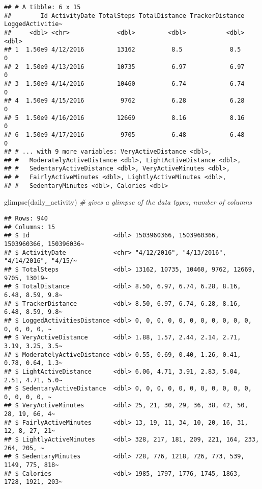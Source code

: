 \documentclass[
]{article}
\newenvironment{Shaded}{\begin{snugshade}}{\end{snugshade}}
\newcommand{\CommentTok}[1]{\textcolor[rgb]{0.56,0.35,0.01}{\textit{#1}}}
\newcommand{\FunctionTok}[1]{\textcolor[rgb]{0.00,0.00,0.00}{#1}}
\newcommand{\NormalTok}[1]{#1}
\begin{document}
\begin{verbatim}
## # A tibble: 6 x 15
##        Id ActivityDate TotalSteps TotalDistance TrackerDistance LoggedActivitie~
##     <dbl> <chr>             <dbl>         <dbl>           <dbl>            <dbl>
## 1  1.50e9 4/12/2016         13162          8.5             8.5                 0
## 2  1.50e9 4/13/2016         10735          6.97            6.97                0
## 3  1.50e9 4/14/2016         10460          6.74            6.74                0
## 4  1.50e9 4/15/2016          9762          6.28            6.28                0
## 5  1.50e9 4/16/2016         12669          8.16            8.16                0
## 6  1.50e9 4/17/2016          9705          6.48            6.48                0
## # ... with 9 more variables: VeryActiveDistance <dbl>,
## #   ModeratelyActiveDistance <dbl>, LightActiveDistance <dbl>,
## #   SedentaryActiveDistance <dbl>, VeryActiveMinutes <dbl>,
## #   FairlyActiveMinutes <dbl>, LightlyActiveMinutes <dbl>,
## #   SedentaryMinutes <dbl>, Calories <dbl>
\end{verbatim}

\begin{Shaded}
\begin{Highlighting}[]
\FunctionTok{glimpse}\NormalTok{(daily\_activity) }\CommentTok{\# gives a glimpse of the data types, number of columns  }
\end{Highlighting}
\end{Shaded}

\begin{verbatim}
## Rows: 940
## Columns: 15
## $ Id                       <dbl> 1503960366, 1503960366, 1503960366, 150396036~
## $ ActivityDate             <chr> "4/12/2016", "4/13/2016", "4/14/2016", "4/15/~
## $ TotalSteps               <dbl> 13162, 10735, 10460, 9762, 12669, 9705, 13019~
## $ TotalDistance            <dbl> 8.50, 6.97, 6.74, 6.28, 8.16, 6.48, 8.59, 9.8~
## $ TrackerDistance          <dbl> 8.50, 6.97, 6.74, 6.28, 8.16, 6.48, 8.59, 9.8~
## $ LoggedActivitiesDistance <dbl> 0, 0, 0, 0, 0, 0, 0, 0, 0, 0, 0, 0, 0, 0, 0, ~
## $ VeryActiveDistance       <dbl> 1.88, 1.57, 2.44, 2.14, 2.71, 3.19, 3.25, 3.5~
## $ ModeratelyActiveDistance <dbl> 0.55, 0.69, 0.40, 1.26, 0.41, 0.78, 0.64, 1.3~
## $ LightActiveDistance      <dbl> 6.06, 4.71, 3.91, 2.83, 5.04, 2.51, 4.71, 5.0~
## $ SedentaryActiveDistance  <dbl> 0, 0, 0, 0, 0, 0, 0, 0, 0, 0, 0, 0, 0, 0, 0, ~
## $ VeryActiveMinutes        <dbl> 25, 21, 30, 29, 36, 38, 42, 50, 28, 19, 66, 4~
## $ FairlyActiveMinutes      <dbl> 13, 19, 11, 34, 10, 20, 16, 31, 12, 8, 27, 21~
## $ LightlyActiveMinutes     <dbl> 328, 217, 181, 209, 221, 164, 233, 264, 205, ~
## $ SedentaryMinutes         <dbl> 728, 776, 1218, 726, 773, 539, 1149, 775, 818~
## $ Calories                 <dbl> 1985, 1797, 1776, 1745, 1863, 1728, 1921, 203~
\end{verbatim}
\end{document}
